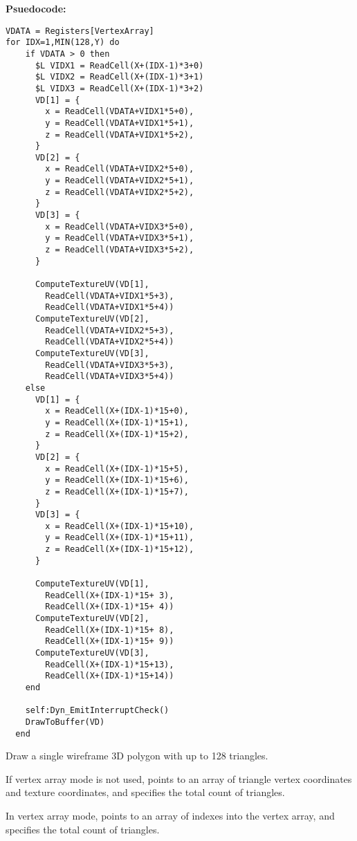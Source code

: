 \textbf{Psuedocode:}
\begin{verbatim}
VDATA = Registers[VertexArray]
for IDX=1,MIN(128,Y) do
    if VDATA > 0 then
      $L VIDX1 = ReadCell(X+(IDX-1)*3+0)
      $L VIDX2 = ReadCell(X+(IDX-1)*3+1)
      $L VIDX3 = ReadCell(X+(IDX-1)*3+2)
      VD[1] = {
        x = ReadCell(VDATA+VIDX1*5+0),
        y = ReadCell(VDATA+VIDX1*5+1),
        z = ReadCell(VDATA+VIDX1*5+2),
      }
      VD[2] = {
        x = ReadCell(VDATA+VIDX2*5+0),
        y = ReadCell(VDATA+VIDX2*5+1),
        z = ReadCell(VDATA+VIDX2*5+2),
      }
      VD[3] = {
        x = ReadCell(VDATA+VIDX3*5+0),
        y = ReadCell(VDATA+VIDX3*5+1),
        z = ReadCell(VDATA+VIDX3*5+2),
      }
      
      ComputeTextureUV(VD[1],
        ReadCell(VDATA+VIDX1*5+3),
        ReadCell(VDATA+VIDX1*5+4))
      ComputeTextureUV(VD[2],
        ReadCell(VDATA+VIDX2*5+3),
        ReadCell(VDATA+VIDX2*5+4))
      ComputeTextureUV(VD[3],
        ReadCell(VDATA+VIDX3*5+3),
        ReadCell(VDATA+VIDX3*5+4))
    else
      VD[1] = {
        x = ReadCell(X+(IDX-1)*15+0),
        y = ReadCell(X+(IDX-1)*15+1),
        z = ReadCell(X+(IDX-1)*15+2),
      }
      VD[2] = {
        x = ReadCell(X+(IDX-1)*15+5),
        y = ReadCell(X+(IDX-1)*15+6),
        z = ReadCell(X+(IDX-1)*15+7),
      }
      VD[3] = {
        x = ReadCell(X+(IDX-1)*15+10),
        y = ReadCell(X+(IDX-1)*15+11),
        z = ReadCell(X+(IDX-1)*15+12),
      }
      
      ComputeTextureUV(VD[1],
        ReadCell(X+(IDX-1)*15+ 3),
        ReadCell(X+(IDX-1)*15+ 4))
      ComputeTextureUV(VD[2],
        ReadCell(X+(IDX-1)*15+ 8),
        ReadCell(X+(IDX-1)*15+ 9))
      ComputeTextureUV(VD[3],
        ReadCell(X+(IDX-1)*15+13),
        ReadCell(X+(IDX-1)*15+14))
    end
    
    self:Dyn_EmitInterruptCheck()
    DrawToBuffer(VD)
  end
\end{verbatim}


Draw a single wireframe 3D polygon with up to 128 triangles.

If vertex array mode is not used,  points to an array of triangle vertex coordinates and texture coordinates, and  specifies the total count of triangles.

In vertex array mode,  points to an array of indexes into the vertex array, and  specifies the total count of triangles.

